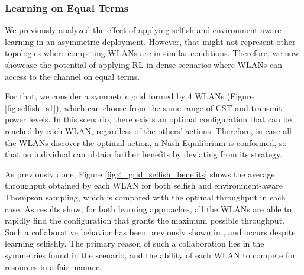 \documentclass[preprint,12pt]{elsarticle}
\begin{document}
\subsubsection{Learning on Equal Terms}
\label{subsubsection:resources_maximization}  
We previously analyzed the effect of applying selfish and environment-aware learning in an asymmetric deployment. However, that might not represent other topologies where competing WLANs are in similar conditions. Therefore, we now showcase the potential of applying RL in dense scenarios where WLANs can access to the channel on equal terms. 

For that, we consider a symmetric grid formed by 4 WLANs (Figure \ref{fig:selfish_s1}), which can choose from the same range of CST and transmit power levels. In this scenario, there exists an optimal configuration that can be reached by each WLAN, regardless of the others' actions. Therefore, in case all the WLANs discover the optimal action, a Nash Equilibrium is conformed, so that no individual can obtain further benefits by deviating from its strategy. 

As previously done, Figure \ref{fig:4_grid_selfish_benefits} shows the average throughput obtained by each WLAN for both selfish and environment-aware Thompson sampling, which is compared with the optimal throughput in each case. As results show, for both learning approaches, all the WLANs are able to rapidly find the configuration that grants the maximum possible throughput. Such a collaborative behavior has been previously shown in \cite{wilhelmi2017collaborative}, and occurs despite learning selfishly. The primary reason of such a collaboration lies in the symmetries found in the scenario, and the ability of each WLAN to compete for resources in a fair manner.
\end{document}
